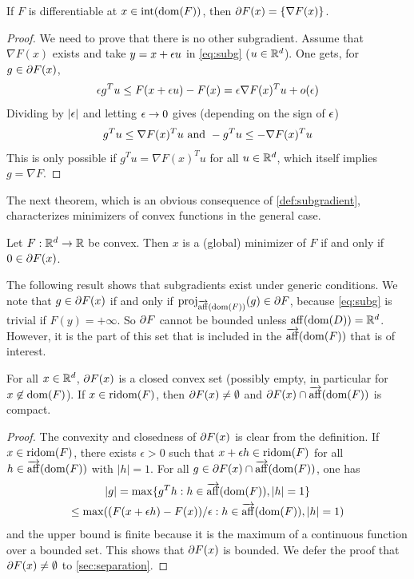 \begin{proposition}
\label{prop:subg.diff}
If $F$ is differentiable at $x\in \mathrm{int}({\mathrm{dom}}(F))$, then  $\partial F(x) = \{\nabla F(x)\}$.
\end{proposition}
\begin{proof}
We need to prove that there is no other subgradient.
Assume that $\nabla F(x)$ exists and take 
$y = x + \epsilon u$ in \cref{eq:subg}  ($u\in {\mathbb{R}}^d$). One gets, for $g\in \partial F(x)$, 
\[
\epsilon g^Tu \leq F(x+\epsilon u) - F(x) = \epsilon \nabla F(x)^Tu + o(\epsilon)
\]
Dividing by $|\epsilon|$ and letting $\epsilon\to 0$ gives (depending on the sign of $\epsilon$)
\[
 g^Tu \leq  \nabla F(x)^T u\ \text{\color{black}  and } - g^Tu \leq - \nabla F(x)^T u
\]
This is only possible if $g^Tu = \nabla F(x)^T u$ for all $u\in{\mathbb{R}}^d$, which itself implies $g=\nabla F$. 
\end{proof}

The next theorem, which is an obvious consequence of \cref{def:subgradient},  characterizes minimizers of convex functions in the general case.
\begin{theorem}
\label{th:subg}
Let $F: {\mathbb{R}}^d\to {\mathbb{R}}$ be convex. Then $x$ is a (global) minimizer of $F$ if and only if $0\in \partial F(x)$.
\end{theorem}

The following result shows that subgradients exist under generic conditions. We note that $g\in \partial F(x)$ if and only if $\mathrm{proj}_{\overrightarrow{\mathrm{aff}}(\mathrm{dom}(F))}(g) \in \partial F$, because \cref{eq:subg} is trivial if $F(y) = +\infty$. So $\partial F$ cannot be bounded unless $\mathrm{aff}(\mathrm{dom}(D)) = {\mathbb{R}}^d$. However, it is the part of this set that is included in  the $\overrightarrow{\mathrm{aff}}(\mathrm{dom}(F))$ that is of interest.
\begin{proposition}
\label{prop:subg.exist}
For all $x\in {\mathbb{R}}^d$, $\partial F(x)$ is a closed convex set (possibly empty, in particular for $x\not\in \mathrm{dom}(F)$).
If $x\in\mathrm{ridom}(F)$, then $\partial F(x) \neq \emptyset$ and $\partial F(x) \cap \overrightarrow{\mathrm{aff}}(\mathrm{dom}(F))$ is compact.
\end{proposition}
\begin{proof}
The convexity and closedness of $\partial F(x)$ is clear from the definition.  If $x\in \mathrm{ridom}(F)$, there exists $\epsilon>0$ such that $x+\epsilon h\in \mathrm{ridom}(F)$ for all $h\in \overrightarrow{\mathrm{aff}}(\mathrm{dom}(F))$ with $|h|=1$. For all $g \in \partial F(x)\cap \overrightarrow{\mathrm{aff}}(\mathrm{dom}(F))$, one has
\begin{multline*}
|g| = \max\{g^T h: h\in \overrightarrow{\mathrm{aff}}(\mathrm{dom}(F)), |h|=1\}\\
 \leq \max((F(x+\epsilon h) - F(x))/\epsilon: h\in \overrightarrow{\mathrm{aff}}(\mathrm{dom}(F)), |h|=1)
\end{multline*}
and the upper bound is finite because it is the maximum of a continuous function over a bounded set. This shows that $\partial F(x)$ is bounded. We defer the proof that $\partial F(x)\neq \emptyset$ to \cref{sec:separation}.
\end{proof}

